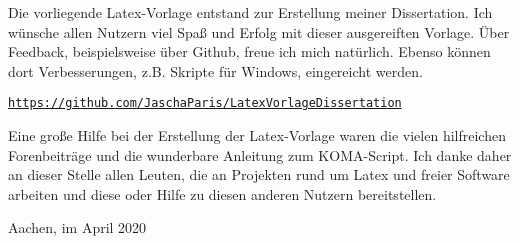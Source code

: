 
Die vorliegende Latex-Vorlage entstand zur Erstellung meiner Dissertation. Ich wünsche allen Nutzern viel Spaß und Erfolg mit dieser ausgereiften Vorlage. Über Feedback, beispielsweise über Github, freue ich mich natürlich. Ebenso können dort Verbesserungen, z.B. Skripte für Windows, eingereicht werden.

\texttt{\url{https://github.com/JaschaParis/LatexVorlageDissertation}}

Eine große Hilfe bei der Erstellung der Latex-Vorlage waren die vielen hilfreichen Forenbeiträge und die wunderbare Anleitung zum \textsc{KOMA}-Script. Ich danke daher an dieser Stelle allen Leuten, die an Projekten rund um Latex und freier Software arbeiten und diese oder Hilfe zu diesen anderen Nutzern bereitstellen.

\vspace{5mm}
\par
\begingroup
\leftskip=1cm %
\noindent 
Aachen, im April 2020

\vspace{-5mm}
\leftskip=1cm %
\dissauthor
\par
\endgroup
